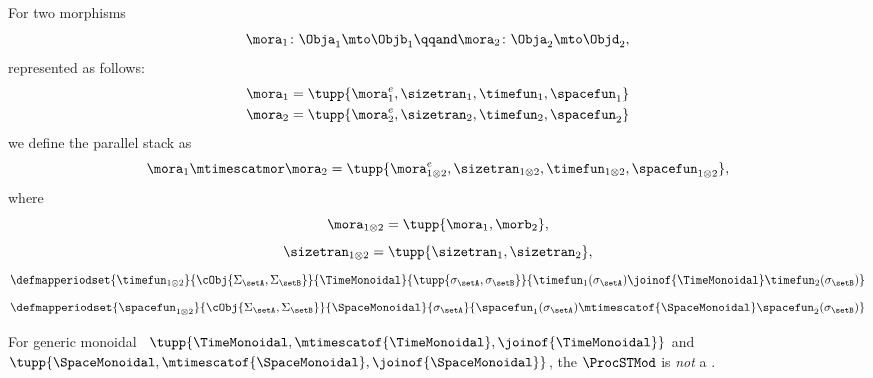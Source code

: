 \begin{lemma}
    For two morphisms
    \begin{equation}
        \mora_1 \colon \Obja_1 \mto \Objb_1
        \qqand
        \mora_2 \colon \Obja_2 \mto \Objd_2,
    \end{equation}
    represented as follows:
    \begin{align}
        \mora_1 & = \tupp{\mora^e_1, \sizetran_1, \timefun_1,
        \spacefun_{1} } \\
        \mora_2 & = \tupp{\mora^e_2, \sizetran_2, \timefun_2, \spacefun_{2} }
    \end{align}
    we define the parallel stack as
    \begin{equation}
        \mora_1 \mtimescatmor \mora_2 = \tupp{
        \mora^e_{1\otimes2},
        \sizetran_{1\otimes2},
        \timefun_{1\otimes2},
        \spacefun_{1\otimes2}
        },
    \end{equation}
    where
    \begin{equation}
        \mora_{1\otimes2} = \tupp{\mora_1, \morb_2},
    \end{equation}
    \begin{equation}
        \sizetran_{1\otimes2} = \tupp{\sizetran_1, \sizetran_2},
    \end{equation}
    \begin{equation}
        \defmapperiodset{
            \timefun_{1\otimes 2}
        }{
            \cObj {\Sigma_{\setA}, \Sigma_{\setB}}
        }{
            \TimeMonoidal
        }{
            \tupp{\sigma_{\setA}, \sigma_{\setB}}
        }{
            \timefun_1(\sigma_{\setA}) \joinof{\TimeMonoidal} \timefun_2(\sigma_{\setB})
        }
    \end{equation}
    \begin{equation}
        \defmapperiodset{
            \spacefun_{1\otimes2}
        }{
            \cObj {\Sigma_{\setA}, \Sigma_{\setB}}
        }{
            \SpaceMonoidal
        }{
            \sigma_{\setA}
        }{
            \spacefun_1(\sigma_{\setA}) \mtimescatof{\SpaceMonoidal} \spacefun_2(\sigma_{\setB})
        }
    \end{equation}
\end{lemma}

\begin{lemma}
    For generic monoidal ~$\tupp{\TimeMonoidal, \mtimescatof{\TimeMonoidal}, \joinof{\TimeMonoidal}}$ and $\tupp{\SpaceMonoidal, \mtimescatof{\SpaceMonoidal}, \joinof{\SpaceMonoidal}}$, the  $\ProcSTMod$ is \emph{not} a .
\end{lemma}

